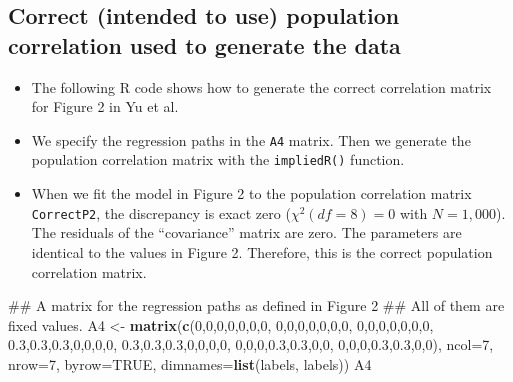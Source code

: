 \documentclass[]{article}
\newenvironment{Shaded}{\begin{snugshade}}{\end{snugshade}}
\newcommand{\KeywordTok}[1]{\textcolor[rgb]{0.13,0.29,0.53}{\textbf{#1}}}
\newcommand{\DataTypeTok}[1]{\textcolor[rgb]{0.13,0.29,0.53}{#1}}
\newcommand{\DecValTok}[1]{\textcolor[rgb]{0.00,0.00,0.81}{#1}}
\newcommand{\FloatTok}[1]{\textcolor[rgb]{0.00,0.00,0.81}{#1}}
\newcommand{\StringTok}[1]{\textcolor[rgb]{0.31,0.60,0.02}{#1}}
\newcommand{\OtherTok}[1]{\textcolor[rgb]{0.56,0.35,0.01}{#1}}
\newcommand{\NormalTok}[1]{#1}
\providecommand{\tightlist}{%
  \setlength{\itemsep}{0pt}\setlength{\parskip}{0pt}}
\begin{document}
\subsection{Correct (intended to use) population correlation used to
generate the
data}\label{correct-intended-to-use-population-correlation-used-to-generate-the-data-1}

\begin{itemize}
\tightlist
\item
  The following R code shows how to generate the correct correlation
  matrix for Figure 2 in Yu et al.
\item
  We specify the regression paths in the \texttt{A4} matrix. Then we
  generate the population correlation matrix with the
  \texttt{impliedR()} function.
\item
  When we fit the model in Figure 2 to the population correlation matrix
  \texttt{CorrectP2}, the discrepancy is exact zero (\(\chi^2(df=8)=0\)
  with \(N=1,000\)). The residuals of the ``covariance'' matrix are
  zero. The parameters are identical to the values in Figure 2.
  Therefore, this is the correct population correlation matrix.
\end{itemize}

\begin{Shaded}
\begin{Highlighting}[]
\NormalTok{## A matrix for the regression paths as defined in Figure 2}
\NormalTok{## All of them are fixed values.}
\NormalTok{A4 <-}\StringTok{ }\KeywordTok{matrix}\NormalTok{(}\KeywordTok{c}\NormalTok{(}\DecValTok{0}\NormalTok{,}\DecValTok{0}\NormalTok{,}\DecValTok{0}\NormalTok{,}\DecValTok{0}\NormalTok{,}\DecValTok{0}\NormalTok{,}\DecValTok{0}\NormalTok{,}\DecValTok{0}\NormalTok{,}
               \DecValTok{0}\NormalTok{,}\DecValTok{0}\NormalTok{,}\DecValTok{0}\NormalTok{,}\DecValTok{0}\NormalTok{,}\DecValTok{0}\NormalTok{,}\DecValTok{0}\NormalTok{,}\DecValTok{0}\NormalTok{,}
               \DecValTok{0}\NormalTok{,}\DecValTok{0}\NormalTok{,}\DecValTok{0}\NormalTok{,}\DecValTok{0}\NormalTok{,}\DecValTok{0}\NormalTok{,}\DecValTok{0}\NormalTok{,}\DecValTok{0}\NormalTok{,}
               \FloatTok{0.3}\NormalTok{,}\FloatTok{0.3}\NormalTok{,}\FloatTok{0.3}\NormalTok{,}\DecValTok{0}\NormalTok{,}\DecValTok{0}\NormalTok{,}\DecValTok{0}\NormalTok{,}\DecValTok{0}\NormalTok{,}
               \FloatTok{0.3}\NormalTok{,}\FloatTok{0.3}\NormalTok{,}\FloatTok{0.3}\NormalTok{,}\DecValTok{0}\NormalTok{,}\DecValTok{0}\NormalTok{,}\DecValTok{0}\NormalTok{,}\DecValTok{0}\NormalTok{,}
               \DecValTok{0}\NormalTok{,}\DecValTok{0}\NormalTok{,}\DecValTok{0}\NormalTok{,}\FloatTok{0.3}\NormalTok{,}\FloatTok{0.3}\NormalTok{,}\DecValTok{0}\NormalTok{,}\DecValTok{0}\NormalTok{,}
               \DecValTok{0}\NormalTok{,}\DecValTok{0}\NormalTok{,}\DecValTok{0}\NormalTok{,}\FloatTok{0.3}\NormalTok{,}\FloatTok{0.3}\NormalTok{,}\DecValTok{0}\NormalTok{,}\DecValTok{0}\NormalTok{), }\DataTypeTok{ncol=}\DecValTok{7}\NormalTok{, }\DataTypeTok{nrow=}\DecValTok{7}\NormalTok{, }\DataTypeTok{byrow=}\OtherTok{TRUE}\NormalTok{,}
             \DataTypeTok{dimnames=}\KeywordTok{list}\NormalTok{(labels, labels))}
\NormalTok{A4}
\end{Highlighting}
\end{Shaded}
\end{document}
